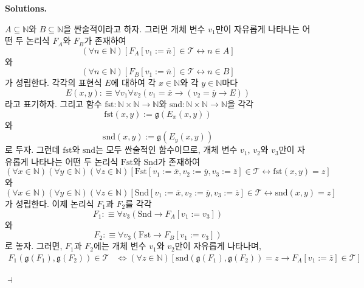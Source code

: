 \documentclass[12pt]{paper}
\newcommand{\gnum}
{ \mathfrak{g}
}
\newenvironment{context}[1][]
{ \noindent \textbf{{#1}.}
}
{ \hfill $ \dashv $
}
\begin{document}
\begin{context}[Solutions]
\begin{enumerate}
      $A \subseteq \mathbb{N}$와 $B \subseteq \mathbb{N}$을 싼술적이라고 하자.
      그러면 개체 변수 $v_1$만이 자유롭게 나타나는 어떤 두 논리식 $F_A$와 $F_B$가 존재하여
      $$ \left( \forall n \in \mathbb{N} \right) \left[ F_A \left[ v_1 := \overline{n} \right] \in \mathcal{T} \leftrightarrow n \in A \right]$$와
      $$ \left( \forall n \in \mathbb{N} \right) \left[ F_B \left[ v_1 := \overline{n} \right] \in \mathcal{T} \leftrightarrow n \in B \right]$$가 성립한다.
      각각의 표현식 $E$에 대하여 각 $x \in \mathbb{N}$와 각 $y \in \mathbb{N}$마다 $$E \left( x , y \right) : \equiv \forall v_1 \forall v_2 \left( v_1 = \overline{x} \rightarrow \left( v_2 = \overline{y} \rightarrow E \right) \right)$$라고 표기하자.
      그리고 함수 $\mathrm{fst} : \mathbb{N} \times \mathbb{N} \to \mathbb{N}$와 $\mathrm{snd} : \mathbb{N} \times \mathbb{N} \to \mathbb{N}$을
      각각 $$ \mathrm{fst} \left( x , y \right) := \gnum \left( E_x \left( x , y \right) \right)$$와
      $$\mathrm{snd} \left( x , y \right) := \gnum \left( E_y \left( x , y \right) \right)$$로 두자.
      그런데 $\mathrm{fst}$와 $\mathrm{snd}$는 모두 싼술적인 함수이므로,
      개체 변수 $v_1$, $v_2$와 $v_3$만이 자유롭게 나타나는 어떤 두 논리식 $\mathrm{Fst}$와 $\mathrm{Snd}$가 존재하여
      $$ \left( \forall x \in \mathbb{N} \right) \left( \forall y \in \mathbb{N} \right) \left( \forall z \in \mathbb{N} \right) \left[ \mathrm{Fst} \left[ v_1 := \overline{x} , v_2 := \overline{y} , v_3 := \overline{z} \right] \in \mathcal{T} \leftrightarrow \mathrm{fst} \left( x , y \right) = z \right] $$와
      $$ \left( \forall x \in \mathbb{N} \right) \left( \forall y \in \mathbb{N} \right) \left( \forall z \in \mathbb{N} \right) \left[ \mathrm{Snd} \left[ v_1 := \overline{x} , v_2 := \overline{y} , v_3 := \overline{z} \right] \in \mathcal{T} \leftrightarrow \mathrm{snd} \left( x , y \right) = z \right] $$가 성립한다.
      이제 논리식 $F_1$과 $F_2$를 각각 $$F_1 : \equiv \forall v_3 \left( \mathrm{Snd} \rightarrow F_A \left[ v_1 := v_3 \right] \right)$$와 $$F_2 : \equiv \forall v_3 \left( \mathrm{Fst} \rightarrow F_B \left[ v_1 := v_3 \right] \right)$$로 놓자.
      그러면, $F_1$과 $F_2$에는 개체 변수 $v_1$와 $v_2$만이 자유롭게 나타나며,
      \begin{align*}
        F_1 \left( \gnum \left( F_1 \right) , \gnum \left( F_2 \right) \right) \in \mathcal{T}
        & \iff \left( \forall z \in \mathbb{N} \right) \left[ \mathrm{snd} \left( \gnum \left( F_1 \right) , \gnum \left( F_2 \right) \right) = z \rightarrow F_A \left[ v_1 := \overline{z} \right] \in \mathcal{T} \right] \\

\end{align*}
\end{enumerate}
\end{context}
\end{document}
